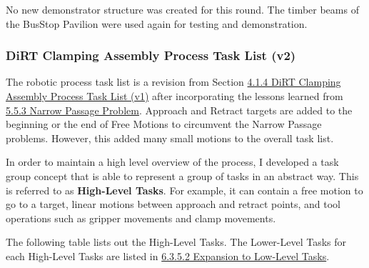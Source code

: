 \documentclass[11pt]{book}
\begin{document}
No new demonstrator structure was created for this round. The timber beams of the BusStop Pavilion were used again for testing and demonstration. 

\subsubsection{DiRT Clamping Assembly Process Task List (v2)}

The robotic process task list is a revision from Section \uline{4.1.4 DiRT Clamping Assembly Process Task List (v1)} after incorporating the lessons learned from \uline{5.5.3 Narrow Passage Problem}. Approach and Retract targets are added to the beginning or the end of Free Motions to circumvent the Narrow Passage problems. However, this added many small motions to the overall task list.

In order to maintain a high level overview of the process, I developed a task group concept that is able to represent a group of tasks in an abstract way. This is referred to as \textbf{High-Level Tasks}. For example, it can contain a free motion to go to a target, linear motions between approach and retract points, and tool operations such as gripper movements and clamp movements. 

The following table lists out the High-Level Tasks. The Lower-Level Tasks for each High-Level Tasks are listed in \uline{6.3.5.2 Expansion to Low-Level Tasks}. 
\end{document}
